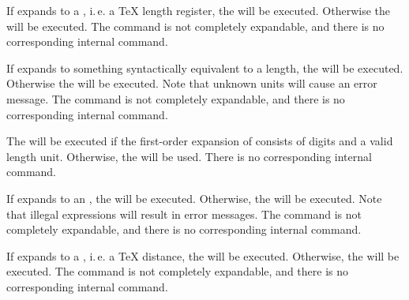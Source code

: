 \begin{Declaration}
\end{Declaration}
If
 expands to a , i.\,e. a \TeX{} length
register, the  will be executed. Otherwise the  will be executed. The command is not completely expandable, and there
is no corresponding internal command.%
\EndIndexGroup


\begin{Declaration}
\end{Declaration}
If
 expands to something syntactically equivalent to a length,
the  will be executed.  Otherwise the  will
be executed. Note  that unknown units will cause an error
message. The command is not completely expandable, and there is no
corresponding internal command.%
\EndIndexGroup


\begin{Declaration}
\end{Declaration}
The  will be executed if
the first-order expansion of  consists of digits and a valid
length unit. Otherwise, the  will be used. There is no
corresponding internal command.%
\EndIndexGroup


\begin{Declaration}
\end{Declaration}
If
 expands to an \eTeX{} ,
the  will be executed.  Otherwise, the  will
be executed. Note  that illegal expressions will result
in error messages. The command is not completely expandable, and there is no
corresponding internal command.%
\EndIndexGroup


\begin{Declaration}
\end{Declaration}
If
 expands to a , i.\,e. a \TeX{} distance, the
 will be executed. Otherwise, the  will be
executed. The command is not completely expandable, and there is no
corresponding internal command.%
\EndIndexGroup


